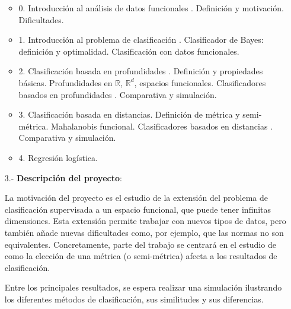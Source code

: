 \documentclass[a4paper,oneside,11pt,leqno]{article}
\begin{document}
\begin{enumerate}
            \begin{itemize}
                  \item 0. Introducción al análisis de datos funcionales \cite{Ramsay-Silverman,Ferraty-Vieu,Cuevas}.
                         Definición y motivación.
                         Dificultades.
                  \item 1. Introducción al problema de clasificación \cite{tesis,MFC}.
                         Clasificador de Bayes: definición y optimalidad.
                         Clasificación con datos funcionales.
                  \item 2. Clasificación basada en profundidades \cite{depth-classification}.
                         Definición y propiedades básicas.
                         Profundidades en $\mathbb{R}$, $\mathbb{R}^d$, espacios funcionales.
                         Clasificadores basados en profundidades \cite{maximum-depth,DD-classifier,DDG-classifier}.
                         Comparativa y simulación.
                  \item 3. Clasificación basada en distancias.
                         Definición de métrica y semi-métrica.
                         Mahalanobis funcional.
                         Clasificadores basados en distancias \cite{trimmed-means}.
                         Comparativa y simulación.
                  \item 4. Regresión logística.
            \end{itemize}

      \item[3.-] {\bf Descripción del proyecto}:

            La motivación del proyecto es el estudio de la extensión del problema de clasificación supervisada a
            un espacio funcional, que puede tener infinitas dimensiones. Esta extensión permite trabajar con nuevos tipos de
            datos, pero también añade nuevas dificultades como, por ejemplo, que las normas no son equivalentes. Concretamente,
            parte del trabajo se centrará en el estudio de como la elección de una métrica (o semi-métrica) afecta
            a los resultados de clasificación.

            Entre los principales resultados, se espera realizar una simulación ilustrando los diferentes
            métodos de clasificación, sus similitudes y sus diferencias.


\end{enumerate}
\end{document}
